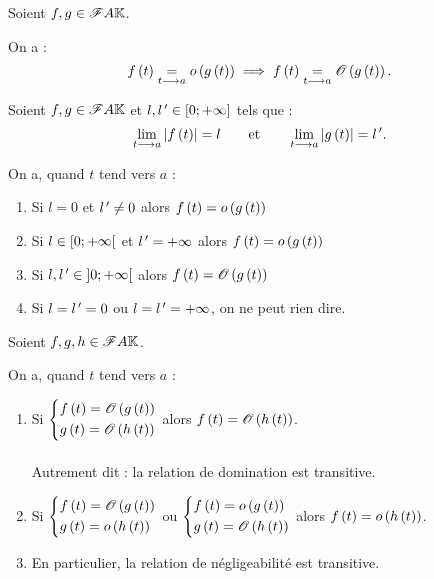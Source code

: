 \begin{prop}
Soient \(f,g\in\mathscr{F}{A}{\mathbb{K}}\).

On a : \[f\left(t\right)\underset{t\longrightarrow a}{=}o\left(g\left(t\right)\right)\implies f\left(t\right)\underset{t\longrightarrow a}{=}\mathscr{O}\left(g\left(t\right)\right).\]
\end{prop}

\begin{prop}
Soient \(f,g\in\mathscr{F}{A}{\mathbb{K}}\) et \(l,l^{\,\prime}\in\left[0;+\infty\right]\) tels que : \[\lim_{t\longrightarrow a}\left\lvert f\left(t\right)\right\rvert=l\qquad\text{et}\qquad\lim_{t\longrightarrow a}\left\lvert g\left(t\right)\right\rvert=l^{\,\prime}.\]

On a, quand \(t\) tend vers \(a\) :

\begin{enumerate}
    \item Si \(l=0\) et \(l^{\,\prime}\not=0\) alors \(f\left(t\right)=o\left(g\left(t\right)\right)\) \\
    \item Si \(l\in\left[0;+\infty\right[\) et \(l^{\,\prime}=+\infty\) alors \(f\left(t\right)=o\left(g\left(t\right)\right)\) \\
    \item Si \(l,l^{\,\prime}\in\left]0;+\infty\right[\) alors \(f\left(t\right)=\mathscr{O}\left(g\left(t\right)\right)\) \\
    \item Si \(l=l^{\,\prime}=0\) ou \(l=l^{\,\prime}=+\infty\), on ne peut rien dire.
\end{enumerate}
\end{prop}

\begin{prop}[Transitivités]
Soient \(f,g,h\in\mathscr{F}{A}{\mathbb{K}}\).

On a, quand \(t\) tend vers \(a\) :

\begin{enumerate}
    \item Si \(\begin{dcases}
        f\left(t\right)=\mathscr{O}\left(g\left(t\right)\right) \\
        g\left(t\right)=\mathscr{O}\left(h\left(t\right)\right)
    \end{dcases}\) alors \(f\left(t\right)=\mathscr{O}\left(h\left(t\right)\right)\). \\\\ Autrement dit : la relation de domination est transitive. \\
    \item Si \(\begin{dcases}
        f\left(t\right)=\mathscr{O}\left(g\left(t\right)\right) \\
        g\left(t\right)=o\left(h\left(t\right)\right)
    \end{dcases}\) ou \(\begin{dcases}
        f\left(t\right)=o\left(g\left(t\right)\right) \\
        g\left(t\right)=\mathscr{O}\left(h\left(t\right)\right)
    \end{dcases}\) alors \(f\left(t\right)=o\left(h\left(t\right)\right)\). \\
    \item En particulier, la relation de négligeabilité est transitive.
\end{enumerate}
\end{prop}

